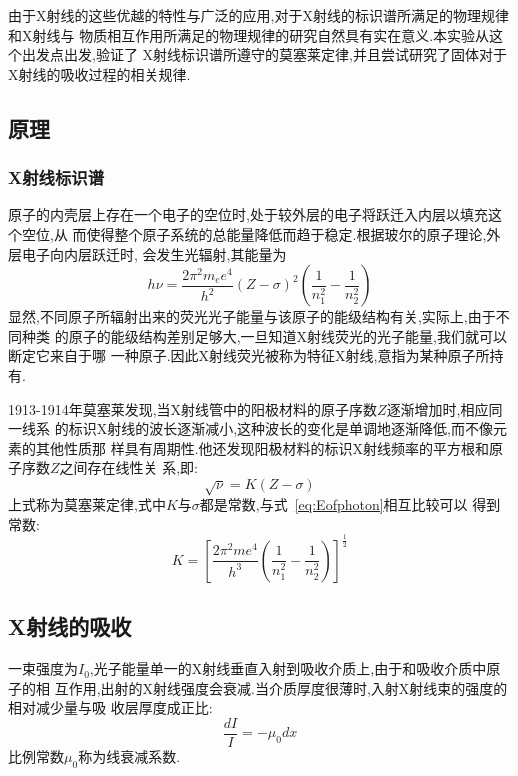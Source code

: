 \documentclass[aps,pre,12pt,preprint,onecolumn,showpacs,showkeys]{revtex4-1}
\begin{document}
由于X射线的这些优越的特性与广泛的应用,对于X射线的标识谱所满足的物理规律和X射线与
物质相互作用所满足的物理规律的研究自然具有实在意义.本实验从这个出发点出发,验证了
X射线标识谱所遵守的莫塞莱定律,并且尝试研究了固体对于X射线的吸收过程的相关规律.

\subsection{原理}

\subsubsection{X射线标识谱}

原子的内壳层上存在一个电子的空位时,处于较外层的电子将跃迁入内层以填充这个空位,从
而使得整个原子系统的总能量降低而趋于稳定.根据玻尔的原子理论,外层电子向内层跃迁时,
会发生光辐射,其能量为
\begin{equation}
    \label{eq:Eofphoton}
    h\nu = \frac{2\pi^2m_ee^4}{h^2}(Z - \sigma)^2(\frac{1}{n_1^2} -
    \frac{1}{n_2^2})
\end{equation}
显然,不同原子所辐射出来的荧光光子能量与该原子的能级结构有关,实际上,由于不同种类
的原子的能级结构差别足够大,一旦知道X射线荧光的光子能量,我们就可以断定它来自于哪
一种原子.因此X射线荧光被称为特征X射线,意指为某种原子所持有.

1913-1914年莫塞莱发现,当X射线管中的阳极材料的原子序数$Z$逐渐增加时,相应同一线系
的标识X射线的波长逐渐减小,这种波长的变化是单调地逐渐降低,而不像元素的其他性质那
样具有周期性.他还发现阳极材料的标识X射线频率的平方根和原子序数$Z$之间存在线性关
系,即:
\begin{equation}
    \label{eq:law}
    \sqrt{\nu} = K(Z - \sigma)
\end{equation}
上式称为莫塞莱定律,式中$K$与$\sigma$都是常数,与式~\ref{eq:Eofphoton}相互比较可以
得到常数:
\begin{equation}
    K = \left[\frac{2\pi^2me^4}{h^3}\left(\frac{1}{n_1^2} -
            \frac{1}{n_2^2}\right)\right]^{\frac{1}{2}}
\end{equation}

\subsection{X射线的吸收}

一束强度为$I_0$,光子能量单一的X射线垂直入射到吸收介质上,由于和吸收介质中原子的相
互作用,出射的X射线强度会衰减.当介质厚度很薄时,入射X射线束的强度的相对减少量与吸
收层厚度成正比:
\begin{equation}
    \label{eq:dII}
    \frac{dI}{I} = - \mu_0 dx
\end{equation}
比例常数$\mu_0$称为线衰减系数.
\end{document}
